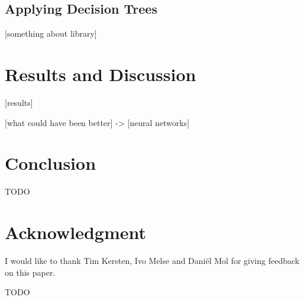 \documentclass[conference]{IEEEtran}
\begin{document}
\subsection{Applying Decision Trees}
[something about library]


\section{Results and Discussion}
[results]

[what could have been better] -> [neural networks]

\section{Conclusion}
TODO

\section*{Acknowledgment}
I would like to thank Tim Kersten, Ivo Melse and Dani\"{e}l Mol for giving feedback on this paper.


\begin{thebibliography}{00}
 TODO
\end{thebibliography}
\end{document}
